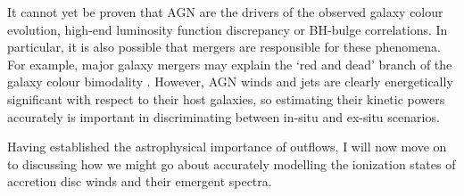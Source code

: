 It cannot yet be proven that AGN are the drivers of the observed 
galaxy colour evolution, high-end luminosity function discrepancy or
BH-bulge correlations. 
In particular, it is also possible that mergers are responsible for these phenomena. 
For example, major galaxy mergers may explain the `red and dead' branch
of the galaxy colour bimodality \citep[e.g.][]{somerville2001,baldry2004}. 
However, AGN winds and jets are clearly 
energetically significant with respect to their host galaxies, so estimating
their kinetic powers accurately is important in discriminating between in-situ
and ex-situ scenarios. 

Having established the astrophysical importance of outflows, 
I will now move on to discussing how we might go about 
accurately modelling the ionization states of accretion disc winds 
and their emergent spectra.


